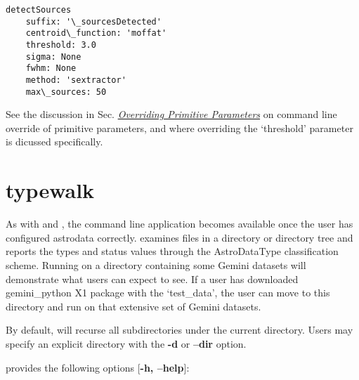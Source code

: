 \documentclass[letterpaper,10pt,english]{sphinxmanual}
\begin{document}
\begin{Verbatim}[commandchars=\\\{\}]
detectSources
    suffix: '\_sourcesDetected'
    centroid\_function: 'moffat'
    threshold: 3.0
    sigma: None
    fwhm: None
    method: 'sextractor'
    max\_sources: 50
\end{Verbatim}

See the discussion in Sec. {\hyperref[interfaces:userpars]{\emph{Overriding Primitive Parameters}}} on command line override of
primitive parameters, and where overriding the `threshold' parameter is dicussed
specifically.


\section{typewalk}
\label{supptools:typewalk}\label{supptools:id1}
As with  and , the command line application 
becomes available once the user has configured astrodata correctly. 
examines files in a directory or directory tree and reports the types and status
values through the AstroDataType classification scheme. Running  on a
directory containing some Gemini datasets will demonstrate what users can expect
to see. If a user has downloaded gemini\_python X1 package with the `test\_data', the
user can move to this directory and run  on that extensive set of
Gemini datasets.

By default,  will recurse all subdirectories under the current
directory. Users may specify an explicit directory with the \textbf{-d} or
\textbf{--dir} option.

 provides the following options {[}\textbf{-h, --help}{]}:
\end{document}
